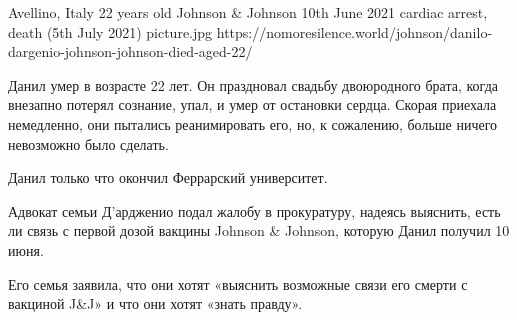           {Avellino, Italy}
          {22 years old}
          {Johnson \& Johnson }
          {10th June 2021}
          {cardiac arrest, death (5th July 2021)}
          {picture.jpg}
          {https://nomoresilence.world/johnson/danilo-dargenio-johnson-johnson-died-aged-22/}
          {

Данил умер в возрасте 22 лет. Он праздновал свадьбу двоюродного брата, когда
внезапно потерял сознание, упал, и умер от остановки сердца. Скорая приехала
немедленно, они пытались реанимировать его, но, к сожалению, больше ничего
невозможно было сделать.

Данил только что окончил Феррарский университет.

Адвокат семьи Д'ардженио подал жалобу в прокуратуру, надеясь выяснить, есть ли
связь с первой дозой вакцины Johnson \& Johnson, которую Данил получил 10 июня.

Его семья заявила, что они хотят «выяснить возможные связи его смерти с вакциной
J\&J» и что они хотят «знать правду».

}
